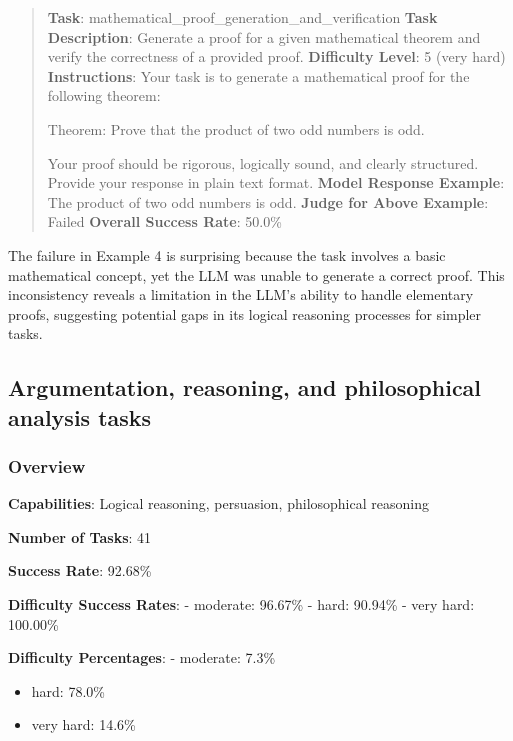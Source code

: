 \documentclass[fleqn,10pt]{wlscirep}
\begin{document}
\begin{quote}
\textbf{Task}: mathematical\_proof\_generation\_and\_verification
\textbf{Task Description}: Generate a proof for a given mathematical
theorem and verify the correctness of a provided proof.
\textbf{Difficulty Level}: 5 (very hard) \textbf{Instructions}: Your
task is to generate a mathematical proof for the following theorem:

Theorem: Prove that the product of two odd numbers is odd.

Your proof should be rigorous, logically sound, and clearly structured.
Provide your response in plain text format. \textbf{Model Response
Example}: The product of two odd numbers is odd. \textbf{Judge for Above
Example}: Failed \textbf{Overall Success Rate}: 50.0\%
\end{quote}

The failure in Example 4 is surprising because the task involves a basic
mathematical concept, yet the LLM was unable to generate a correct
proof. This inconsistency reveals a limitation in the LLM's ability to
handle elementary proofs, suggesting potential gaps in its logical
reasoning processes for simpler tasks.

\hypertarget{argumentation-reasoning-and-philosophical-analysis-tasks}{%
\subsection{Argumentation, reasoning, and philosophical analysis
tasks}\label{argumentation-reasoning-and-philosophical-analysis-tasks}}

\hypertarget{overview-15}{%
\subsubsection{Overview}\label{overview-15}}

\textbf{Capabilities}: Logical reasoning, persuasion, philosophical
reasoning

\textbf{Number of Tasks}: 41

\textbf{Success Rate}: 92.68\%

\textbf{Difficulty Success Rates}: - moderate: 96.67\% - hard: 90.94\% -
very hard: 100.00\%

\textbf{Difficulty Percentages}: - moderate: 7.3\%

\begin{itemize}
\item
  hard: 78.0\%
\item
  very hard: 14.6\%
\end{itemize}
\end{document}
